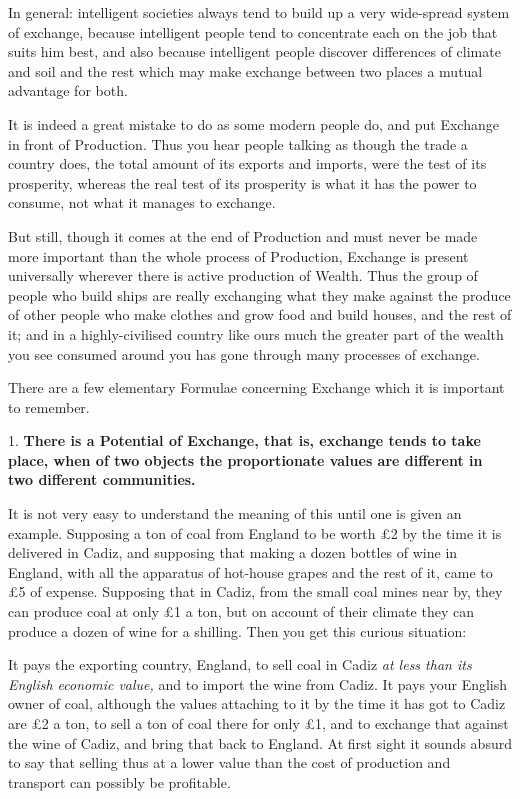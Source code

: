\documentclass{book}
\begin{document}
In general: intelligent societies always tend to build up a very wide-spread system of exchange, because intelligent people tend to concentrate each on the job that suits him best, and also because intelligent people discover differences of climate and soil and the rest which may make exchange between two places a mutual advantage for both.

It is indeed a great mistake to do as some modern people do, and put Exchange in front of Production. Thus you hear people talking as though the trade a country does, the total amount of its exports and imports, were the test of its prosperity, whereas the real test of its prosperity is what it has the power to consume, not what it manages to exchange.

But still, though it comes at the end of Production and must never be made more important than the whole process of Production, Exchange is present universally wherever there is active production of Wealth. Thus the group of people who build ships are really exchanging what they make against the produce of other people who make clothes and grow food and build houses, and the rest of it; and in a highly-civilised country like ours much the greater part of the wealth you see consumed around you has gone through many processes of exchange.

There are a few elementary Formulae concerning Exchange which it is important to remember.

1. \textbf{There is a Potential of Exchange, that is, exchange tends to take place, when of two objects the proportionate values are different in two different communities.}

It is not very easy to understand the meaning of this until one is given an example. Supposing a ton of coal from England to be worth £2 by the time it is delivered in Cadiz, and supposing that making a dozen bottles of wine in England, with all the apparatus of hot-house grapes and the rest of it, came to £5 of expense. Supposing that in Cadiz, from the small coal mines near by, they can produce coal at only £1 a ton, but on account of their climate they can produce a dozen of wine for a shilling. Then you get this curious situation:

It pays the exporting country, England, to sell coal in Cadiz \emph{at less than its English economic value,} and to import the wine from Cadiz. It pays your English owner of coal, although the values attaching to it by the time it has got to Cadiz are £2 a ton, to sell a ton of coal there for only £1, and to exchange that against the wine of Cadiz, and bring that back to England. At first sight it sounds absurd to say that selling thus at a lower value than the cost of production and transport can possibly be profitable.
\end{document}
